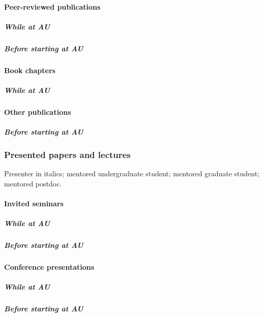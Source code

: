 \paragraph{Peer-reviewed publications}

\subparagraph*{While at AU}
\nocite{*}
\printbibliography[filter=cvpapersnopreprints, check=afteraustart, heading=none]

\subparagraph*{Before starting at AU}
\nocite{*}
\printbibliography[filter=cvpapersnopreprints, check=beforeaustart, heading=none]

\paragraph{Book chapters}

\subparagraph*{While at AU}
\nocite{*}
\printbibliography[filter=bookchapters, check=afteraustart, heading=none]

\paragraph{Other publications}
\subparagraph*{Before starting at AU}


\subsubsection{Presented papers and lectures}
Presenter in italics;
\ugsymbol{}mentored undergraduate student;
\phdsymbol{}mentored graduate student;
\postdocsymbol{}mentored postdoc.

\paragraph{Invited seminars}
\subparagraph*{While at AU}
\nocite{*}
\printbibliography[filter=auinvitedpresentation, heading=none]

\subparagraph*{Before starting at AU}
\nocite{*}
\printbibliography[filter=beforeauinvitedpresentation, heading=none]

\paragraph{Conference presentations}
\subparagraph*{While at AU}
\nocite{*}
\printbibliography[filter=aupresentation, heading=none]

\subparagraph{Before starting at AU}
\nocite{*}
\printbibliography[filter=beforeaupresentation, heading=none]

